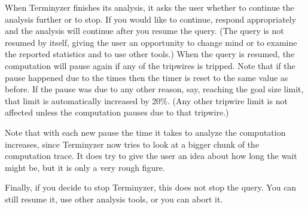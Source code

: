 When Terminyzer finishes its analysis, it asks the user whether to continue
the analysis further or to stop. If you would like to continue, respond
appropriately and the analysis will continue after you resume the query.
(The query is not resumed by itself, giving the user an opportunity to change
mind or to examine the reported statistics and to use other tools.)
When the query is resumed, the computation will pause again if any of the
tripwires is tripped. Note that if the pause happened due to the times then
the timer is reset to the same value as before. If the pause was due to any
other reason, say, reaching the goal size limit, that limit is
automatically increased by 20\%. (Any other tripwire limit is not
affected unless the computation pauses due to that tripwire.)

Note that with each new pause the time it takes to analyze the computation
increases, since Terminyzer now tries to look at a bigger chunk of the
computation trace. It does try to give the user an idea about how long the
wait might be, but it is only a very rough figure.

Finally, if you decide to stop Terminyzer, this does not stop the query.
You can still resume it, use other analysis tools, or you can abort it.




